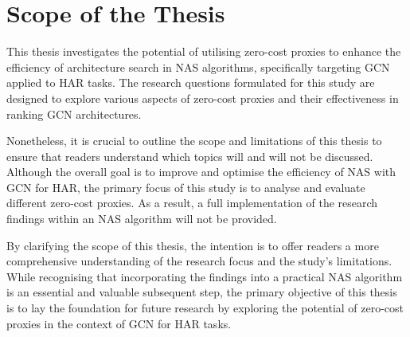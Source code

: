 \section{Scope of the Thesis}

This thesis investigates the potential of utilising zero-cost proxies to enhance the efficiency of architecture search in \gls{NAS} algorithms, specifically targeting \gls{GCN} applied to \gls{HAR} tasks. The research questions formulated for this study are designed to explore various aspects of zero-cost proxies and their effectiveness in ranking \gls{GCN} architectures.

Nonetheless, it is crucial to outline the scope and limitations of this thesis to ensure that readers understand which topics will and will not be discussed. Although the overall goal is to improve and optimise the efficiency of \gls{NAS} with \gls{GCN} for \gls{HAR}, the primary focus of this study is to analyse and evaluate different zero-cost proxies. As a result, a full implementation of the research findings within an \gls{NAS} algorithm will not be provided.

By clarifying the scope of this thesis, the intention is to offer readers a more comprehensive understanding of the research focus and the study's limitations. While recognising that incorporating the findings into a practical \gls{NAS} algorithm is an essential and valuable subsequent step, the primary objective of this thesis is to lay the foundation for future research by exploring the potential of zero-cost proxies in the context of \gls{GCN} for \gls{HAR} tasks.